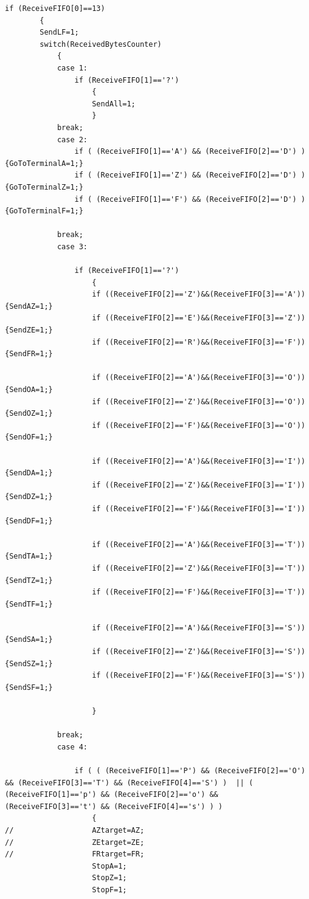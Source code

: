 \documentclass[
  a4paper,
  twoside,
  titlepage,
  12pt]{article}
\numberwithin{equation}{section}
\numberwithin{figure}{section}
\numberwithin{table}{section}
\begin{document}
\begin{verbatim}
if (ReceiveFIFO[0]==13)
        {
        SendLF=1;
        switch(ReceivedBytesCounter)
            {
            case 1:
                if (ReceiveFIFO[1]=='?')
                    {
                    SendAll=1;
                    }
            break;
            case 2:
                if ( (ReceiveFIFO[1]=='A') && (ReceiveFIFO[2]=='D') ) {GoToTerminalA=1;}
                if ( (ReceiveFIFO[1]=='Z') && (ReceiveFIFO[2]=='D') ) {GoToTerminalZ=1;}
                if ( (ReceiveFIFO[1]=='F') && (ReceiveFIFO[2]=='D') ) {GoToTerminalF=1;}

            break;
            case 3:

                if (ReceiveFIFO[1]=='?')
                    {
                    if ((ReceiveFIFO[2]=='Z')&&(ReceiveFIFO[3]=='A')) {SendAZ=1;}
                    if ((ReceiveFIFO[2]=='E')&&(ReceiveFIFO[3]=='Z')) {SendZE=1;}
                    if ((ReceiveFIFO[2]=='R')&&(ReceiveFIFO[3]=='F')) {SendFR=1;}

                    if ((ReceiveFIFO[2]=='A')&&(ReceiveFIFO[3]=='O')) {SendOA=1;}
                    if ((ReceiveFIFO[2]=='Z')&&(ReceiveFIFO[3]=='O')) {SendOZ=1;}
                    if ((ReceiveFIFO[2]=='F')&&(ReceiveFIFO[3]=='O')) {SendOF=1;}

                    if ((ReceiveFIFO[2]=='A')&&(ReceiveFIFO[3]=='I')) {SendDA=1;}
                    if ((ReceiveFIFO[2]=='Z')&&(ReceiveFIFO[3]=='I')) {SendDZ=1;}
                    if ((ReceiveFIFO[2]=='F')&&(ReceiveFIFO[3]=='I')) {SendDF=1;}

                    if ((ReceiveFIFO[2]=='A')&&(ReceiveFIFO[3]=='T')) {SendTA=1;}
                    if ((ReceiveFIFO[2]=='Z')&&(ReceiveFIFO[3]=='T')) {SendTZ=1;}
                    if ((ReceiveFIFO[2]=='F')&&(ReceiveFIFO[3]=='T')) {SendTF=1;}

                    if ((ReceiveFIFO[2]=='A')&&(ReceiveFIFO[3]=='S')) {SendSA=1;}
                    if ((ReceiveFIFO[2]=='Z')&&(ReceiveFIFO[3]=='S')) {SendSZ=1;}
                    if ((ReceiveFIFO[2]=='F')&&(ReceiveFIFO[3]=='S')) {SendSF=1;}

                    }

            break;
            case 4:

                if ( ( (ReceiveFIFO[1]=='P') && (ReceiveFIFO[2]=='O') && (ReceiveFIFO[3]=='T') && (ReceiveFIFO[4]=='S') )  || ( (ReceiveFIFO[1]=='p') && (ReceiveFIFO[2]=='o') && (ReceiveFIFO[3]=='t') && (ReceiveFIFO[4]=='s') ) )
                    {
//                  AZtarget=AZ;
//                  ZEtarget=ZE;
//                  FRtarget=FR;
                    StopA=1;
                    StopZ=1;
                    StopF=1;


\end{verbatim}
\end{document}
